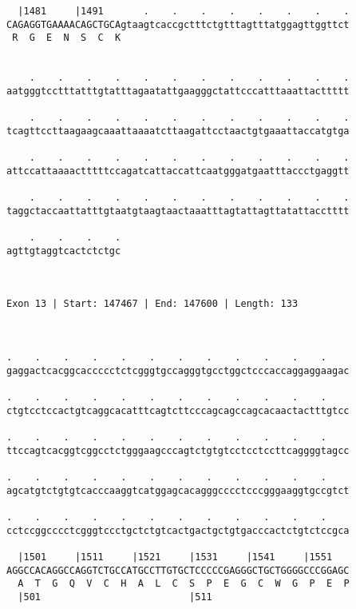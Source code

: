 \documentclass{article}
\begin{document}
\begin{Verbatim}
  |1481     |1491       .    .    .    .    .    .    .    .
CAGAGGTGAAAACAGCTGCAgtaagtcaccgctttctgtttagtttatggagttggttct
 R  G  E  N  S  C  K                                        
                                                            
  
    .    .    .    .    .    .    .    .    .    .    .    .
aatgggtcctttatttgtatttagaatattgaagggctattcccatttaaattacttttt
                                                            
    .    .    .    .    .    .    .    .    .    .    .    .
tcagttccttaagaagcaaattaaaatcttaagattcctaactgtgaaattaccatgtga
                                                            
    .    .    .    .    .    .    .    .    .    .    .    .
attccattaaaactttttccagatcattaccattcaatgggatgaatttaccctgaggtt
                                                            
    .    .    .    .    .    .    .    .    .    .    .    .
taggctaccaattatttgtaatgtaagtaactaaatttagtattagttatattacctttt
                                                            
    .    .    .    .
agttgtaggtcactctctgc
                    
                    
 
Exon 13 | Start: 147467 | End: 147600 | Length: 133



.    .    .    .    .    .    .    .    .    .    .    .    
gaggactcacggcaccccctctcgggtgccagggtgcctggctcccaccaggaggaagac
                                                            
.    .    .    .    .    .    .    .    .    .    .    .    
ctgtcctccactgtcaggcacatttcagtcttcccagcagccagcacaactactttgtcc
                                                            
.    .    .    .    .    .    .    .    .    .    .    .    
ttccagtcacggtcggcctctgggaagcccagtctgtgtcctcctccttcaggggtagcc
                                                            
.    .    .    .    .    .    .    .    .    .    .    .    
agcatgtctgtgtcacccaaggtcatggagcacagggcccctcccgggaaggtgccgtct
                                                            
.    .    .    .    .    .    .    .    .    .    .    .    
cctccggcccctcgggtccctgctctgtcactgactgctgtgacccactctgtctccgca
                                                            
  |1501     |1511     |1521     |1531     |1541     |1551   
AGGCCACAGGCCAGGTCTGCCATGCCTTGTGCTCCCCCGAGGGCTGCTGGGGCCCGGAGC
  A  T  G  Q  V  C  H  A  L  C  S  P  E  G  C  W  G  P  E  P
  |501                          |511                        
  

\end{Verbatim}
\end{document}
